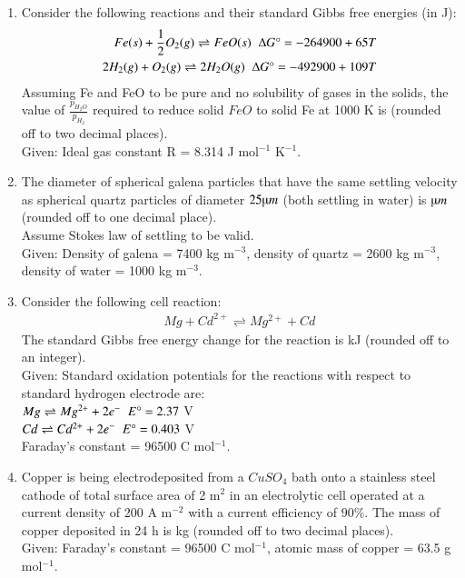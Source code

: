 \documentclass[journal]{IEEEtran}
\theoremstyle{remark}
\begin{document}
\begin{enumerate}[resume]
\item Consider the following reactions and their standard Gibbs free energies (in J): \hfill{} 
\begin{align}
Fe(s) + \frac{1}{2}O_2(g) \rightleftharpoons FeO(s)\; \;\Delta G\degree = -264900 + 65T\\
2 H_2(g) + O_2(g) \rightleftharpoons 2 H_2O(g) \;\;\Delta G\degree = -492900 + 109T
\end{align}
Assuming Fe and FeO to be pure and no solubility of gases in the solids, the value of $\frac{p_{H_2O}}{p_{H_2}}$ required to reduce solid $FeO$ to solid Fe at 1000 K is \underline{\hspace{2cm}} (rounded off to two decimal places). \\
Given: Ideal gas constant R = 8.314 J mol$^{-1}$ K$^{-1}$.

\item The diameter of spherical galena particles that have the same settling velocity as spherical quartz particles of diameter $25\micro m$ (both settling in water) is \underline{\hspace{2cm}} $\micro m$ (rounded off to one decimal place). \hfill{} \\
Assume Stokes law of settling to be valid. \\
Given: Density of galena = 7400 kg m$^{-3}$, density of quartz = 2600 kg m$^{-3}$, density of water = 1000 kg m$^{-3}$.

\item Consider the following cell reaction: \hfill{} 
\begin{align}
Mg + Cd^{2+} \rightleftharpoons Mg^{2+} + Cd
\end{align}
The standard Gibbs free energy change for the reaction is \underline{\hspace{2cm}} kJ (rounded off to an integer). \\
Given: Standard oxidation potentials for the reactions with respect to standard hydrogen electrode are: \\
$Mg \rightleftharpoons Mg^{2+} + 2e^-\;\;E\degree = 2.37$ V \\
$Cd \rightleftharpoons Cd^{2+} + 2e^- \;\; E\degree = 0.403$ V \\
Faraday’s constant = 96500 C mol$^{-1}$.

\item Copper is being electrodeposited from a $CuSO_4$ bath onto a stainless steel cathode of total surface area of 2 m$^2$ in an electrolytic cell operated at a current density of 200 A m$^{-2}$ with a current efficiency of $90\%$. The mass of copper deposited in 24 h is \underline{\hspace{2cm}} kg (rounded off to two decimal places). \hfill{} \\
Given: Faraday’s constant = 96500 C mol$^{-1}$, atomic mass of copper = 63.5 g mol$^{-1}$.


\end{enumerate}
\end{document}

